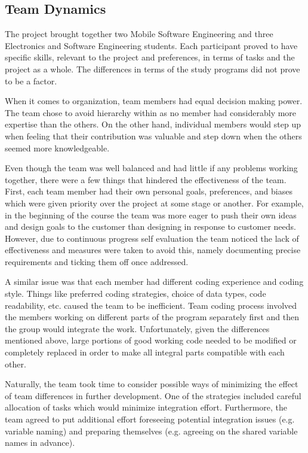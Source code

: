 \documentclass{l3proj}
\begin{document}
\subsection{Team Dynamics}
The project brought together two Mobile Software Engineering and three Electronics and Software Engineering students. 
Each participant proved to have specific skills, relevant to the project and preferences, in terms of tasks and the project as a whole. 
The differences in terms of the study programs did not prove to be a factor.
 
When it comes to organization, team members had equal decision making power. 
The team chose to avoid hierarchy within as no member had considerably more expertise than the others. 
On the other hand, individual members would step up when feeling that their contribution was valuable and step down when the others seemed more knowledgeable. 

Even though the team was well balanced and had little if any problems working together, there were a few things that hindered the effectiveness of the team. 
First, each team member had their own personal goals, preferences, 
and biases which were given priority over the project at some stage or another. 
For example, in the beginning of the course the team was more eager to push their own ideas and design goals to the customer than designing in response to customer needs. 
However, due to continuous progress self evaluation the team noticed the lack of effectiveness and measures were taken to avoid this, 
namely documenting precise requirements and ticking them off once addressed. 

A similar issue was that each member had different coding experience and coding style. 
Things like preferred coding strategies, choice of data types, code readability, etc. caused the team to be inefficient. 
Team coding process involved the members working on different parts of the program separately first and then the group would integrate the work. 
Unfortunately, given the differences mentioned above, large portions of good working code needed to be modified or completely replaced in order to make 
all integral parts compatible with each other. 

Naturally, the team took time to consider possible ways of minimizing the effect of team differences in further development. 
One of the strategies included careful allocation of tasks which would minimize integration effort. Furthermore, the team agreed to put additional effort 
foreseeing potential integration issues (e.g. variable naming) and preparing themselves (e.g. agreeing on the shared variable names in advance).
\end{document}
